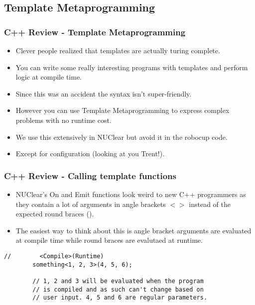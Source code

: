 \documentclass{beamer}
\begin{document}
\subsection{Template Metaprogramming}
\begin{frame}
	\frametitle{C++ Review - Template Metaprogramming}
	\begin{itemize}
		\item Clever people realized that templates are actually turing complete.
		\item You can write some really interesting programs with templates and perform logic at compile time.
		\item Since this was an accident the syntax isn't super-friendly.
		\item However you can use Template Metaprogramming to express complex problems with no runtime cost.
		\item We use this extensively in NUClear but avoid it in the robocup code.
		\item Except for configuration (looking at you Trent!).
	\end{itemize}
\end{frame}

\begin{frame}[fragile]
	\frametitle{C++ Review - Calling template functions}
	\begin{itemize}
		\item NUClear's On and Emit functions look weird to new C++ programmers as they contain a lot of arguments in angle brackets
			$<>$ instead of the expected round braces ().
		\item The easiest way to think about this is angle bracket arguments are evaluated at compile time while round braces are
			evalutaed at runtime.
	\end{itemize}

	\begin{lstlisting}[language=nuclear]
		//	      <Compile>(Runtime)
		something<1, 2, 3>(4, 5, 6);

		// 1, 2 and 3 will be evaluated when the program
		// is compiled and as such can't change based on
		// user input. 4, 5 and 6 are regular parameters.
	\end{lstlisting}
\end{frame}
\end{document}
